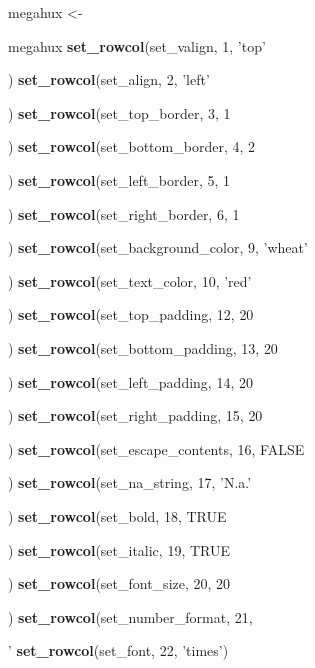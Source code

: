 \documentclass[]{article}
\newenvironment{Shaded}{\begin{snugshade}}{\end{snugshade}}
\newcommand{\KeywordTok}[1]{\textcolor[rgb]{0.13,0.29,0.53}{\textbf{{#1}}}}
\newcommand{\DecValTok}[1]{\textcolor[rgb]{0.00,0.00,0.81}{{#1}}}
\newcommand{\StringTok}[1]{\textcolor[rgb]{0.31,0.60,0.02}{{#1}}}
\newcommand{\OtherTok}[1]{\textcolor[rgb]{0.56,0.35,0.01}{{#1}}}
\newcommand{\NormalTok}[1]{{#1}}
\begin{document}
\begin{Shaded}
\begin{Highlighting}[]
\NormalTok{megahux <-}\StringTok{ }\NormalTok{megahux                                %>%}\StringTok{ }
\StringTok{      }\KeywordTok{set_rowcol}\NormalTok{(set_valign, }\DecValTok{1}\NormalTok{, }\StringTok{'top'}\NormalTok{)              %>%}\StringTok{ }
\StringTok{      }\KeywordTok{set_rowcol}\NormalTok{(set_align, }\DecValTok{2}\NormalTok{, }\StringTok{'left'}\NormalTok{)              %>%}\StringTok{ }
\StringTok{      }\KeywordTok{set_rowcol}\NormalTok{(set_top_border, }\DecValTok{3}\NormalTok{, }\DecValTok{1}\NormalTok{)              %>%}\StringTok{ }
\StringTok{      }\KeywordTok{set_rowcol}\NormalTok{(set_bottom_border, }\DecValTok{4}\NormalTok{, }\DecValTok{2}\NormalTok{)           %>%}\StringTok{ }
\StringTok{      }\KeywordTok{set_rowcol}\NormalTok{(set_left_border, }\DecValTok{5}\NormalTok{, }\DecValTok{1}\NormalTok{)             %>%}\StringTok{ }
\StringTok{      }\KeywordTok{set_rowcol}\NormalTok{(set_right_border, }\DecValTok{6}\NormalTok{, }\DecValTok{1}\NormalTok{)            %>%}\StringTok{ }
\StringTok{      }\KeywordTok{set_rowcol}\NormalTok{(set_background_color, }\DecValTok{9}\NormalTok{, }\StringTok{'wheat'}\NormalTok{)  %>%}\StringTok{ }
\StringTok{      }\KeywordTok{set_rowcol}\NormalTok{(set_text_color, }\DecValTok{10}\NormalTok{, }\StringTok{'red'}\NormalTok{)         %>%}\StringTok{ }
\StringTok{      }\KeywordTok{set_rowcol}\NormalTok{(set_top_padding, }\DecValTok{12}\NormalTok{, }\DecValTok{20}\NormalTok{)           %>%}\StringTok{ }
\StringTok{      }\KeywordTok{set_rowcol}\NormalTok{(set_bottom_padding, }\DecValTok{13}\NormalTok{, }\DecValTok{20}\NormalTok{)        %>%}\StringTok{ }
\StringTok{      }\KeywordTok{set_rowcol}\NormalTok{(set_left_padding, }\DecValTok{14}\NormalTok{, }\DecValTok{20}\NormalTok{)          %>%}\StringTok{ }
\StringTok{      }\KeywordTok{set_rowcol}\NormalTok{(set_right_padding, }\DecValTok{15}\NormalTok{, }\DecValTok{20}\NormalTok{)         %>%}\StringTok{ }
\StringTok{      }\KeywordTok{set_rowcol}\NormalTok{(set_escape_contents, }\DecValTok{16}\NormalTok{, }\OtherTok{FALSE}\NormalTok{)    %>%}
\StringTok{      }\KeywordTok{set_rowcol}\NormalTok{(set_na_string, }\DecValTok{17}\NormalTok{, }\StringTok{'N.a.'}\NormalTok{)         %>%}
\StringTok{      }\KeywordTok{set_rowcol}\NormalTok{(set_bold, }\DecValTok{18}\NormalTok{, }\OtherTok{TRUE}\NormalTok{)                %>%}
\StringTok{      }\KeywordTok{set_rowcol}\NormalTok{(set_italic, }\DecValTok{19}\NormalTok{, }\OtherTok{TRUE}\NormalTok{)              %>%}
\StringTok{      }\KeywordTok{set_rowcol}\NormalTok{(set_font_size, }\DecValTok{20}\NormalTok{, }\DecValTok{20}\NormalTok{)             %>%}
\StringTok{      }\KeywordTok{set_rowcol}\NormalTok{(set_number_format, }\DecValTok{21}\NormalTok{, }\StringTok{'%9.6f'}\NormalTok{)    %>%}
\StringTok{      }\KeywordTok{set_rowcol}\NormalTok{(set_font, }\DecValTok{22}\NormalTok{, }\StringTok{'times'}\NormalTok{)}

}}}}}}}}}}}}}}}}}}}
\end{Highlighting}
\end{Shaded}
\end{document}
